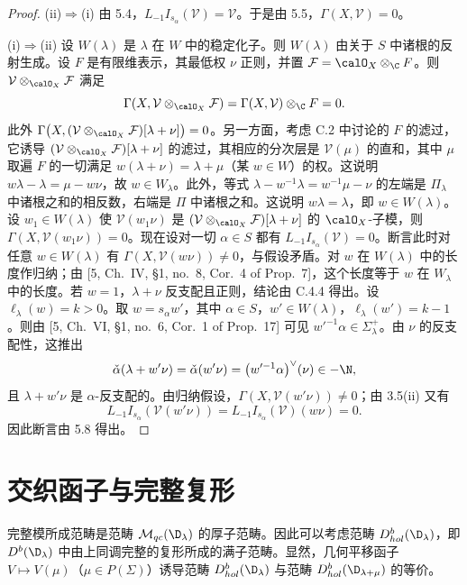 \begin{proof}
(ii)$\Rightarrow$(i) 由 5.4，$L_{-1}I_{s_\alpha}(\mathcal{V})=\mathcal{V}$。于是由 5.5，$\Gamma(X,\mathcal{V})=0$。

(i)$\Rightarrow$(ii) 设 $W(\lambda)$ 是 $\lambda$ 在 $W$ 中的稳定化子。则 $W(\lambda)$ 由关于 $S$ 中诸根的反射生成。设 $F$ 是有限维表示，其最低权 $\nu$ 正则，并置 $\mathcal{F}=\calO_X\otimes_\C F$。则 $\mathcal{V}\otimes_{\calO_X}\mathcal{F}$ 满足
$$\Gamma(X,\mathcal{V}\otimes_{\calO_X}\mathcal{F})=\Gamma(X,\mathcal{V})\otimes_\C F=0.$$
此外 $\Gamma\bigl(X,(\mathcal{V}\otimes_{\calO_X}\mathcal{F})[\lambda+\nu]\bigr)=0$。另一方面，考虑 C.2 中讨论的 $F$ 的滤过，它诱导 $(\mathcal{V}\otimes_{\calO_X}\mathcal{F})[\lambda+\nu]$ 的滤过，其相应的分次层是 $\mathcal{V}(\mu)$ 的直和，其中 $\mu$ 取遍 $F$ 的一切满足 $w(\lambda+\nu)=\lambda+\mu$（某 $w\in W$）的权。这说明 $w\lambda-\lambda=\mu-w\nu$，故 $w\in W_\lambda$。此外，等式 $\lambda-w^{-1}\lambda=w^{-1}\mu-\nu$ 的左端是 $\Pi_\lambda$ 中诸根之和的相反数，右端是 $\Pi$ 中诸根之和。这说明 $w\lambda=\lambda$，即 $w\in W(\lambda)$。设 $w_1\in W(\lambda)$ 使 $\mathcal{V}(w_1\nu)$ 是 $(\mathcal{V}\otimes_{\calO_X}\mathcal{F})[\lambda+\nu]$ 的 $\calO_X$-子模，则 $\Gamma(X,\mathcal{V}(w_1\nu))=0$。现在设对一切 $\alpha\in S$ 都有 $L_{-1}I_{s_\alpha}(\mathcal{V})=0$。断言此时对任意 $w\in W(\lambda)$ 有 $\Gamma(X,\mathcal{V}(w\nu))\ne 0$，与假设矛盾。对 $w$ 在 $W(\lambda)$ 中的长度作归纳；由 [5, Ch.~IV, \S1, no.~8, Cor.~4 of Prop.~7]，这个长度等于 $w$ 在 $W_\lambda$ 中的长度。若 $w=1$，$\lambda+\nu$ 反支配且正则，结论由 C.4.4 得出。设 $\ell_\lambda(w)=k>0$。取 $w=s_\alpha w'$，其中 $\alpha\in S$，$w'\in W(\lambda)$，$\ell_\lambda(w')=k-1$。则由 [5, Ch.~VI, \S1, no.~6, Cor.~1 of Prop.~17] 可见 $w'^{-1}\alpha\in\Sigma^+_\lambda$。由 $\nu$ 的反支配性，这推出
$$\check{\alpha}(\lambda+w'\nu)=\check{\alpha}(w'\nu)=\bigl(w'^{-1}\alpha\bigr)^{\vee}(\nu)\in-\N,$$
且 $\lambda+w'\nu$ 是 $\alpha$-反支配的。由归纳假设，$\Gamma(X,\mathcal{V}(w'\nu))\ne 0$；由 3.5(ii) 又有
$$L_{-1}I_{s_\alpha}(\mathcal{V}(w'\nu))=L_{-1}I_{s_\alpha}(\mathcal{V})(w\nu)=0.$$
因此断言由 5.8 得出。
\end{proof}

\section{交织函子与完整复形}\label{sec:03.3.6}

完整模所成范畴是范畴 $\mathcal{M}_{qc}(\D_\lambda)$ 的厚子范畴。因此可以考虑范畴 $D^b_{hol}(\D_\lambda)$，即 $D^b(\D_\lambda)$ 中由上同调完整的复形所成的满子范畴。显然，几何平移函子 $V\mapsto V(\mu)$（$\mu\in P(\Sigma)$）诱导范畴 $D^b_{hol}(\D_\lambda)$ 与范畴 $D^b_{hol}(\D_{\lambda+\mu})$ 的等价。

